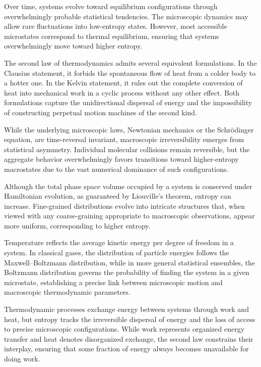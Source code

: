 Over time, systems evolve toward equilibrium configurations through overwhelmingly probable statistical tendencies. The microscopic dynamics may allow rare fluctuations into low-entropy states. However, most accessible microstates correspond to thermal equilibrium, ensuring that systems overwhelmingly move toward higher entropy.

The second law of thermodynamics admits several equivalent formulations. In the Clausius statement, it forbids the spontaneous flow of heat from a colder body to a hotter one. In the Kelvin statement, it rules out the complete conversion of heat into mechanical work in a cyclic process without any other effect. Both formulations capture the unidirectional dispersal of energy and the impossibility of constructing perpetual motion machines of the second kind.

While the underlying microscopic laws, Newtonian mechanics or the Schrödinger equation, are time-reversal invariant, macroscopic irreversibility emerges from statistical asymmetry. Individual molecular collisions remain reversible, but the aggregate behavior overwhelmingly favors transitions toward higher-entropy macrostates due to the vast numerical dominance of such configurations.

Although the total phase space volume occupied by a system is conserved under Hamiltonian evolution, as guaranteed by Liouville's theorem, entropy can increase. Fine-grained distributions evolve into intricate structures that, when viewed with any coarse-graining appropriate to macroscopic observations, appear more uniform, corresponding to higher entropy.

Temperature reflects the average kinetic energy per degree of freedom in a system. In classical gases, the distribution of particle energies follows the Maxwell–Boltzmann distribution, while in more general statistical ensembles, the Boltzmann distribution governs the probability of finding the system in a given microstate, establishing a precise link between microscopic motion and macroscopic thermodynamic parameters.

Thermodynamic processes exchange energy between systems through work and heat, but entropy tracks the irreversible dispersal of energy and the loss of access to precise microscopic configurations. While work represents organized energy transfer and heat denotes disorganized exchange, the second law constrains their interplay, ensuring that some fraction of energy always becomes unavailable for doing work.

